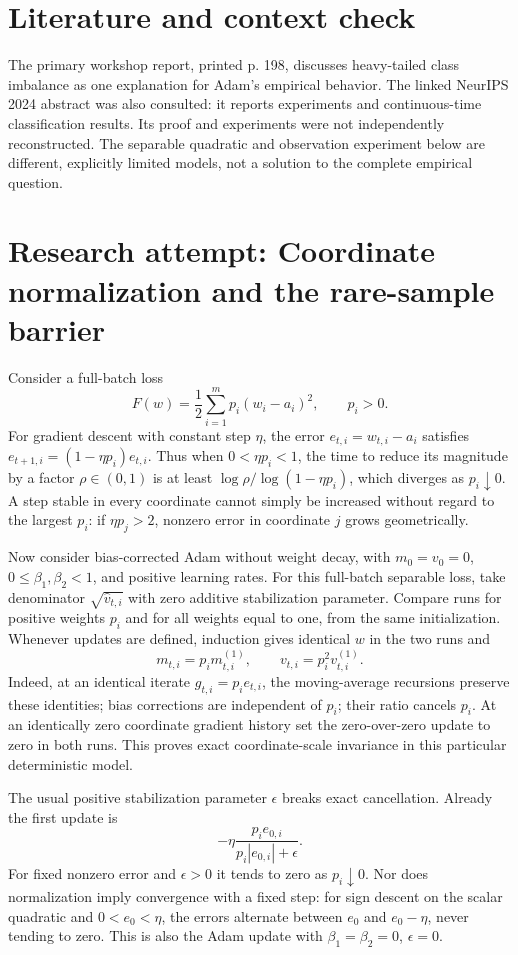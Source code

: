 \documentclass[11pt]{article}
\begin{document}
\section{Literature and context check}
The primary workshop report, printed p. 198, discusses heavy-tailed class imbalance as one explanation for Adam's empirical behavior. The linked NeurIPS 2024 abstract was also consulted: it reports experiments and continuous-time classification results. Its proof and experiments were not independently reconstructed. The separable quadratic and observation experiment below are different, explicitly limited models, not a solution to the complete empirical question.
\section{Research attempt: Coordinate normalization and the rare-sample barrier}

Consider a full-batch loss
\[
F(w)=\frac12\sum_{i=1}^m p_i(w_i-a_i)^2,\qquad p_i>0.
\]
For gradient descent with constant step $\eta$, the error $e_{t,i}=w_{t,i}-a_i$ satisfies $e_{t+1,i}=(1-\eta p_i)e_{t,i}$. Thus when $0<\eta p_i<1$, the time to reduce its magnitude by a factor $\rho\in(0,1)$ is at least $\log\rho/\log(1-\eta p_i)$, which diverges as $p_i\downarrow0$. A step stable in every coordinate cannot simply be increased without regard to the largest $p_i$: if $\eta p_j>2$, nonzero error in coordinate $j$ grows geometrically.

Now consider bias-corrected Adam without weight decay, with $m_0=v_0=0$, $0\leq\beta_1,\beta_2<1$, and positive learning rates. For this full-batch separable loss, take denominator $\sqrt{\widehat v_{t,i}}$ with zero additive stabilization parameter. Compare runs for positive weights $p_i$ and for all weights equal to one, from the same initialization. Whenever updates are defined, induction gives identical $w$ in the two runs and
\[
m_{t,i}=p_i m^{(1)}_{t,i},\qquad v_{t,i}=p_i^2v^{(1)}_{t,i}.
\]
Indeed, at an identical iterate $g_{t,i}=p_i e_{t,i}$, the moving-average recursions preserve these identities; bias corrections are independent of $p_i$; their ratio cancels $p_i$. At an identically zero coordinate gradient history set the zero-over-zero update to zero in both runs. This proves exact coordinate-scale invariance in this particular deterministic model.

The usual positive stabilization parameter $\epsilon$ breaks exact cancellation. Already the first update is
\[
-\eta\frac{p_i e_{0,i}}{p_i|e_{0,i}|+\epsilon}.
\]
For fixed nonzero error and $\epsilon>0$ it tends to zero as $p_i\downarrow0$. Nor does normalization imply convergence with a fixed step: for sign descent on the scalar quadratic and $0<e_0<\eta$, the errors alternate between $e_0$ and $e_0-\eta$, never tending to zero. This is also the Adam update with $\beta_1=\beta_2=0$, $\epsilon=0$.
\end{document}
